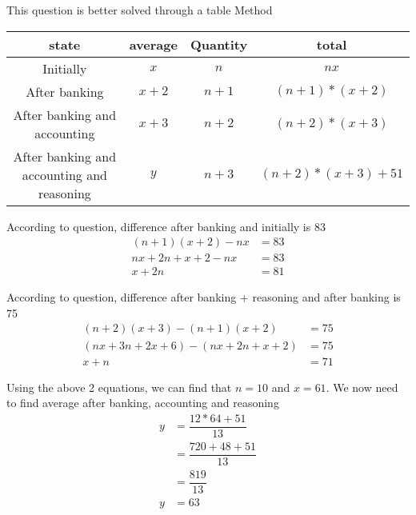 This question is better solved through a table Method

\begin{table}[h!]
    \centering
    \begin{tabular}{|| c | c | c | c ||}
        \hline
        state & average & Quantity & total \\
        \hline
        Initially & $x$ & $n$ & $nx$ \\
        \hline
        After banking & $x + 2$ & $n + 1$ & $(n + 1) * (x + 2)$ \\
        \hline
        After banking and accounting & $x + 3$ & $n + 2$ & $(n + 2) * (x + 3)$ \\
        \hline
        After banking and accounting and reasoning & $y$ & $n + 3$ & $(n + 2) * (x + 3) + 51$ \\
        \hline
    \end{tabular}
\end{table}

According to question, difference after banking and initially is 83
\begin{align*}
    (n + 1) (x + 2) - nx &= 83 \\
    nx + 2n + x + 2 - nx &= 83 \\
    x + 2n &= 81
\end{align*}

According to question, difference after banking + reasoning and after banking is 75
\begin{align*}
    (n + 2) (x + 3) - (n + 1) (x + 2) &= 75 \\
    ( nx + 3n + 2x + 6 ) - ( nx + 2n + x + 2 ) &= 75 \\
    x + n &= 71
\end{align*}

Using the above 2 equations, we can find that $n = 10$ and $x = 61$. We now need to find average after banking, accounting and reasoning 
\begin{align*}
    y &= \dfrac{12 * 64 + 51}{13} \\
    &= \dfrac{720 + 48 + 51}{13} \\
    &= \dfrac{819}{13} \\
    y &= 63 \\
\end{align*}


